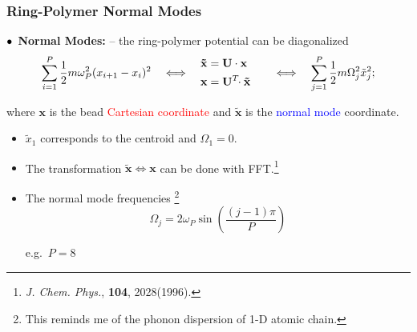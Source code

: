 \begin{frame}
  \frametitle{Ring-Polymer Normal Modes}
  $\bullet\kern1ex$\textbf{Normal Modes:} -- the ring-polymer potential can be diagonalized 
  \begin{equation*}
    \sum_{i=1}^P\frac{1}{2} m\omega_P^2(x_{i+1} - x_i)^2 
    \quad\Longleftrightarrow\quad
    \begin{aligned}
        \mathbf{\tilde{x}} &= \mathbf{U}\cdot \mathbf{x}\cr
        \mathbf{x} &= \mathbf{U}^T\!\!\cdot \mathbf{\tilde{x}}\cr
    \end{aligned}
    \quad\Longleftrightarrow\quad
    \sum_{j=1}^{P}\frac{1}{2} m\Omega_j^2\tilde{x}_j^2;
  \end{equation*}

  where $\mathbf{x}$ is the bead \textcolor{red}{Cartesian coordinate} and $\tilde{\mathbf{x}}$ is the \textcolor{blue}{normal mode}
  coordinate.

  \begin{multicols}{2}
    \begin{itemize}
        \item $\tilde{x}_1$ corresponds to the centroid and $\Omega_1 = 0$.
        \item The transformation $\mathbf{\tilde{x}} \Leftrightarrow \mathbf{x}$
          can be done with FFT.\footnote[frame]{
            \textit{J. Chem. Phys.}, \textbf{104}, 2028(1996).
          }
        \item The normal mode frequencies
        \footnote[frame]{
            This reminds me of the phonon dispersion of 1-D atomic chain.
        }
        \begin{equation*}
            \Omega_j = 2\omega_P \sin\left({\frac{(j-1)\pi}{P}}\right)
        \end{equation*}

        e.g.\ $P = 8$
        \begin{center}
\end{center}
\end{itemize}
\end{multicols}
\end{frame}
